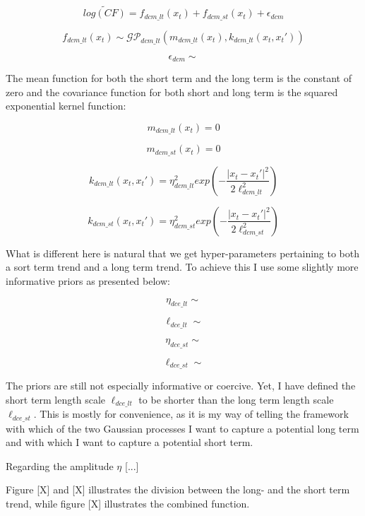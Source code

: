 \documentclass[a4paper]{article}
\begin{document}
\[
\widetilde{log(CF)} = f_{dcm\_lt}(x_t) + f_{dcm\_st}(x_t) + \epsilon_{dcm}
\]

\[
f_{dcm\_lt}(x_t) \sim \mathcal{GP}_{dcm\_lt}(m_{dcm\_lt}(x_t),k_{dcm\_lt}(x_t,x_t')) %
\]

\[
\epsilon_{dcm} \sim 
\]

The mean function for both the short term and the long term is the constant of zero and the covariance function for both short and long term is the squared exponential kernel function:

\[
m_{dcm\_lt}(x_t) = 0
\]

\[
m_{dcm\_st}(x_t) = 0
\]

\[
k_{dcm\_lt}(x_t,x_t') = \eta_{dcm\_lt}^2 exp\left(-\frac{|x_t-x_t'|^2}{2\ell_{dcm\_lt}^2}\right) %
\]

\[
k_{dcm\_st}(x_t,x_t') = \eta_{dcm\_st}^2 exp\left(-\frac{|x_t-x_t'|^2}{2\ell_{dcm\_st}^2}\right) %
\]

What is different here is natural that we get hyper-parameters pertaining to both a sort term trend and a long term trend. To achieve this I use some slightly more informative priors as presented below:

\[
\eta_{dce\_lt} \sim
\]

\[
\ell_{dce\_lt} \sim
\]

\[
\eta_{dce\_st} \sim
\]

\[
\ell_{dce\_st} \sim
\]

The priors are still not especially informative or coercive. Yet, I have defined the short term length scale $\ell_{dce\_lt}$ to be shorter than the long term length scale $\ell_{dce\_st}$. This is mostly for convenience, as it is my way of telling the framework with which of the two Gaussian processes I want to capture a potential long term and with which I want to capture a potential short term.\par

Regarding the amplitude $\eta$ [...]


Figure [X] and [X] illustrates the division between the long- and the short term trend, while figure [X] illustrates the combined function.\par
\end{document}
